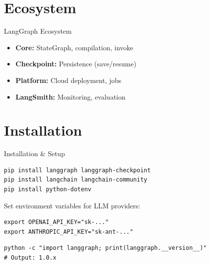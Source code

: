 \documentclass[aspectratio=169,11pt]{beamer}
\begin{document}
\section{Ecosystem}
\begin{frame}[t,shrink=3]{LangGraph Ecosystem}
\vspace{0.05cm}

{\footnotesize
\begin{conceptbox}[Stack]
\setlength{\itemsep}{0.5pt}
\begin{itemize}
  \item \textbf{Core:} StateGraph, compilation, invoke
  \item \textbf{Checkpoint:} Persistence (save/resume)
  \item \textbf{Platform:} Cloud deployment, jobs
  \item \textbf{LangSmith:} Monitoring, evaluation
\end{itemize}
\end{conceptbox}
}
\end{frame}

\section{Installation}
\begin{frame}[fragile,t]{Installation \& Setup}
\vspace{0.1cm}

\begin{codebox}
\begin{lstlisting}
pip install langgraph langgraph-checkpoint
pip install langchain langchain-community
pip install python-dotenv
\end{lstlisting}
\end{codebox}

\vspace{0.1cm}

\begin{tipbox}
Set environment variables for LLM providers:
\begin{lstlisting}
export OPENAI_API_KEY="sk-..."
export ANTHROPIC_API_KEY="sk-ant-..."
\end{lstlisting}
\end{tipbox}

\vspace{0.1cm}

\begin{conceptbox}
\begin{lstlisting}
python -c "import langgraph; print(langgraph.__version__)"
# Output: 1.0.x
\end{lstlisting}
\end{conceptbox}
\end{frame}
\end{document}

